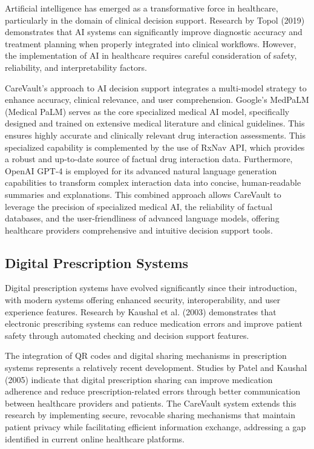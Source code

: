 \documentclass[12pt,a4paper]{article}
\begin{document}
Artificial intelligence has emerged as a transformative force in healthcare, particularly in the domain of clinical decision support. Research by Topol (2019) demonstrates that AI systems can significantly improve diagnostic accuracy and treatment planning when properly integrated into clinical workflows. However, the implementation of AI in healthcare requires careful consideration of safety, reliability, and interpretability factors.

CareVault's approach to AI decision support integrates a multi-model strategy to enhance accuracy, clinical relevance, and user comprehension. Google's MedPaLM (Medical PaLM) serves as the core specialized medical AI model, specifically designed and trained on extensive medical literature and clinical guidelines. This ensures highly accurate and clinically relevant drug interaction assessments. This specialized capability is complemented by the use of RxNav API, which provides a robust and up-to-date source of factual drug interaction data. Furthermore, OpenAI GPT-4 is employed for its advanced natural language generation capabilities to transform complex interaction data into concise, human-readable summaries and explanations. This combined approach allows CareVault to leverage the precision of specialized medical AI, the reliability of factual databases, and the user-friendliness of advanced language models, offering healthcare providers comprehensive and intuitive decision support tools.

\subsection{Digital Prescription Systems}

Digital prescription systems have evolved significantly since their introduction, with modern systems offering enhanced security, interoperability, and user experience features. Research by Kaushal et al. (2003) demonstrates that electronic prescribing systems can reduce medication errors and improve patient safety through automated checking and decision support features.

The integration of QR codes and digital sharing mechanisms in prescription systems represents a relatively recent development. Studies by Patel and Kaushal (2005) indicate that digital prescription sharing can improve medication adherence and reduce prescription-related errors through better communication between healthcare providers and patients. The CareVault system extends this research by implementing secure, revocable sharing mechanisms that maintain patient privacy while facilitating efficient information exchange, addressing a gap identified in current online healthcare platforms.
\end{document}
